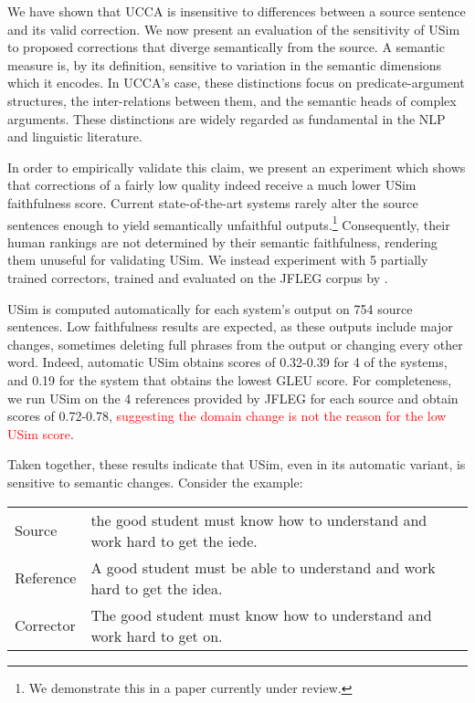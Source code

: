 \documentclass[a4paper, 11pt]{article}
\begin{document}
We have shown that UCCA is insensitive to differences between a source sentence
and its valid correction. We now present an evaluation of the sensitivity of {\sc USim}
to proposed corrections that diverge semantically from the source.
A semantic measure is, by its definition, sensitive to variation in
the semantic dimensions which it encodes. 
In UCCA's case, these distinctions focus on predicate-argument structures,
the inter-relations between them, and the semantic heads of complex arguments.
These distinctions are widely regarded as fundamental in the NLP and linguistic literature.

In order to empirically validate this claim, we present an experiment which shows that corrections
of a fairly low quality indeed receive a much lower {\sc USim} faithfulness score.
Current state-of-the-art systems rarely alter the source sentences enough to yield semantically unfaithful outputs.\footnote{We demonstrate this in a paper currently under review.}
Consequently, their human rankings are not determined by their semantic faithfulness, rendering them unuseful for validating {\sc USim}.
We instead experiment with 5 partially trained correctors, trained and evaluated on the
JFLEG corpus \cite{napoles2017jfleg} by .

{\sc USim} is computed automatically for each system's output on 754 source sentences.
Low faithfulness results are expected, as these outputs include major changes,
sometimes deleting full phrases from the output or changing every other word.
Indeed, automatic {\sc USim} obtains scores of 0.32-0.39 for 4 of the systems, and 0.19
for the system that obtains the lowest GLEU \cite{napoles2015ground} score.
For completeness, we run {\sc USim} on the 4 references provided by JFLEG for each
source and obtain scores of 0.72-0.78, \textcolor{red}{suggesting the domain change is not the reason for the low {\sc USim} score}.

Taken together, these results indicate that {\sc USim}, even in its automatic variant,
is sensitive to semantic changes. Consider the example: 

\begin{table}[h!]
  \centering
  \label{ex:sensitive}
  \begin{tabular}{p{}p{}}
    Source    & \small the good student must know how to understand and work hard to get the iede.\\
    Reference & \small A good student must be able to understand and work hard to get the idea.\\
    Corrector & \small The good student must know how to understand and work hard to get on.     
  \end{tabular}
  
\end{table}
\end{document}

